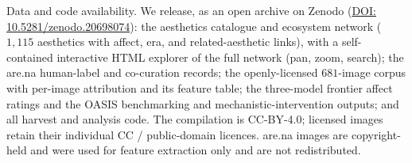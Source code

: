 \documentclass[11pt]{article}
\begin{document}
Data and code availability. We release, as an open archive on Zenodo
(\href{https://doi.org/10.5281/zenodo.20698074}{DOI: 10.5281/zenodo.20698074}): the aesthetics catalogue and ecosystem network
($1{,}115$ aesthetics with affect, era, and related-aesthetic links), with a self-contained
interactive HTML explorer of the full network (pan, zoom, search); the are.na human-label
and co-curation records; the openly-licensed $681$-image corpus with per-image attribution and
its feature table; the three-model frontier affect ratings and the OASIS benchmarking and
mechanistic-intervention outputs; and all harvest and analysis code. The compilation is CC-BY-4.0;
licensed images retain their individual CC / public-domain licences. are.na images are
copyright-held and were used for feature extraction only and are not redistributed.
\end{document}
